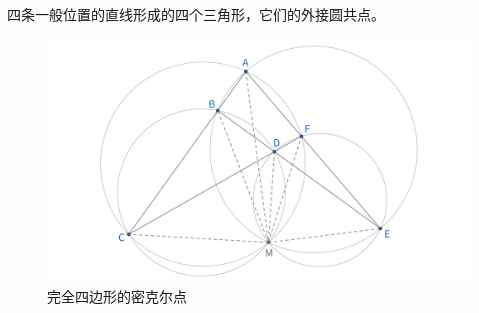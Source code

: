 \newpage 
\begin{theorem}[完全四边形的密克尔点]
    四条一般位置的直线形成的四个三角形，它们的外接圆共点。
\end{theorem}
\begin{figure}[htbp]
    \centering
    \includegraphics[width=\linewidth]{figures/完全四边形密克尔点.png}
    \caption{完全四边形的密克尔点}
\end{figure}

\newpage
\begin{proposition}
    
\end{proposition}